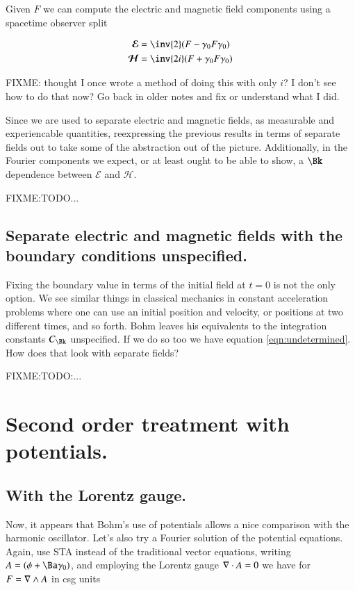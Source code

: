 \documentclass{article}
\newcommand{\EE}[0]{\boldsymbol{\mathcal{E}}}
\newcommand{\HH}[0]{\boldsymbol{\mathcal{H}}}
\begin{document}
Given $F$ we can compute the electric and magnetic field components using a spacetime observer split

\begin{align*}
\EE &= \inv{2}(F - \gamma_0 F \gamma_0 ) \\
\HH &= \inv{2i}(F + \gamma_0 F \gamma_0 ) \\
\end{align*}

FIXME: thought I once wrote a method of doing this with only $i$?  I don't see how to do that now?  Go back in older notes and fix or understand what I did.

Since we are used to separate electric and magnetic fields, as measurable and experiencable quantities, reexpressing the previous results 
in terms of separate fields out to take some of the abstraction out of the picture.  Additionally, in the Fourier components we expect, or at least ought to be able to show, a $\Bk$ dependence between $\EE$ and $\HH$.

FIXME:TODO...

\subsection{ Separate electric and magnetic fields with the boundary conditions unspecified. }

Fixing the boundary value in terms of the initial field at $t=0$ is not the only option.  We see similar things in classical mechanics in constant acceleration problems where one can use an initial position and velocity, or positions at two different times, and so forth.  Bohm leaves his equivalents to the integration constants $C_{\Bk}$ unspecified.  If we do so too we have equation \ref{eqn:undetermined}.  How does that look with separate fields?

FIXME:TODO:...

\section{ Second order treatment with potentials. }

\subsection{ With the Lorentz gauge. }

Now, it appears that Bohm's use of potentials allows a nice comparison with the harmonic oscillator.  Let's also try a Fourier solution of the 
potential equations.  Again, use STA instead of the traditional vector equations, writing $A = (\phi + \Ba \gamma_0)$, and employing the Lorentz gauge
$\nabla \cdot A = 0$ we have for $F = \nabla \wedge A$ in csg units
\end{document}
